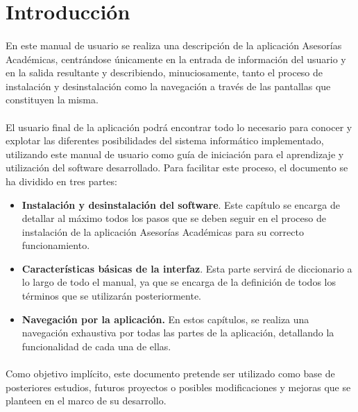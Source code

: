 \section{Introducción}

  \paragraph{}En este manual de usuario se realiza una descripción de la
  aplicación Asesorías Académicas, centrándose únicamente en la entrada de
  información del usuario y en la salida resultante y describiendo,
  minuciosamente, tanto el proceso de instalación y desinstalación como la
  navegación a través de las pantallas que constituyen la misma.

  \paragraph{}El usuario final de la aplicación podrá encontrar todo lo
  necesario para conocer y explotar las diferentes posibilidades del sistema
  informático implementado, utilizando este manual de usuario como guía de
  iniciación para el aprendizaje y utilización del software desarrollado. Para
  facilitar este proceso, el documento se ha dividido en tres partes:

  \begin{itemize}
    \item \textbf{Instalación y desinstalación del software}. Este capítulo se
    encarga de detallar al máximo todos los pasos que se deben seguir en el
    proceso de instalación de la aplicación Asesorías Académicas para su
    correcto funcionamiento.
    \item \textbf{Características básicas de la interfaz}. Esta parte servirá de
    diccionario a lo largo de todo el manual, ya que se encarga de la definición
    de todos los términos que se utilizarán posteriormente.
    \item \textbf{Navegación por la aplicación.} En estos capítulos, se realiza
    una navegación exhaustiva por todas las partes de la aplicación, detallando
    la funcionalidad de cada una de ellas.
  \end{itemize}

  \paragraph{}Como objetivo implícito, este documento pretende ser utilizado
  como base de posteriores estudios, futuros proyectos o posibles modificaciones
  y mejoras que se planteen en el marco de su desarrollo.
